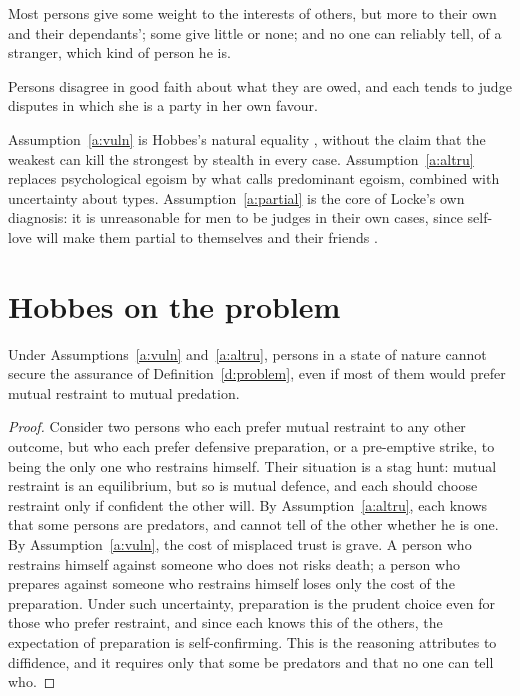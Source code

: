 \documentclass{situationist-preprint}
\begin{document}
\begin{assumption}\label{a:altru}
Most persons give some weight to the interests of others, but more to their own and their dependants'; some give little or none; and no one can reliably tell, of a stranger, which kind of person he is.
\end{assumption}

\begin{assumption}\label{a:partial}
Persons disagree in good faith about what they are owed, and each tends to judge disputes in which she is a party in her own favour.
\end{assumption}

Assumption~\ref{a:vuln} is Hobbes's natural equality \citep[ch.~13]{Hobbes1651}, without the claim that the weakest can kill the strongest by stealth in every case. Assumption~\ref{a:altru} replaces psychological egoism by what \citet[ch.~2]{Kavka1986} calls predominant egoism, combined with uncertainty about types. Assumption~\ref{a:partial} is the core of Locke's own diagnosis: it is unreasonable for men to be judges in their own cases, since self-love will make them partial to themselves and their friends \citep[\S 13]{Locke1689}.

\section{Hobbes on the problem}

\begin{proposition}[Assurance]\label{p:assure}
Under Assumptions~\ref{a:vuln} and~\ref{a:altru}, persons in a state of nature cannot secure the assurance of Definition~\ref{d:problem}, even if most of them would prefer mutual restraint to mutual predation.
\end{proposition}

\begin{proof}
Consider two persons who each prefer mutual restraint to any other outcome, but who each prefer defensive preparation, or a pre-emptive strike, to being the only one who restrains himself. Their situation is a stag hunt: mutual restraint is an equilibrium, but so is mutual defence, and each should choose restraint only if confident the other will. By Assumption~\ref{a:altru}, each knows that some persons are predators, and cannot tell of the other whether he is one. By Assumption~\ref{a:vuln}, the cost of misplaced trust is grave. A person who restrains himself against someone who does not risks death; a person who prepares against someone who restrains himself loses only the cost of the preparation. Under such uncertainty, preparation is the prudent choice even for those who prefer restraint, and since each knows this of the others, the expectation of preparation is self-confirming. This is the reasoning \citet[ch.~13]{Hobbes1651} attributes to diffidence, and it requires only that some be predators and that no one can tell who.
\end{proof}
\end{document}
